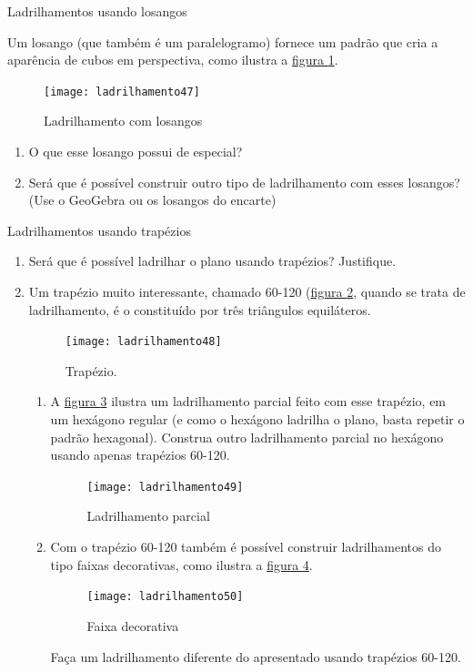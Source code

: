 \begin{task}{Ladrilhamentos usando losangos}

Um losango (que também é um paralelogramo) fornece um padrão que cria a aparência de cubos em perspectiva, como ilustra a \hyperref[losango]{figura \ref{losango}}.

	\begin{figure}[H]
	\centering
	\texttt{[image: ladrilhamento47]}
    \caption{Ladrilhamento com losangos}
   	\label{losango}
	\end{figure}
	
\begin{enumerate}
			\item O que esse losango possui de especial?
			\item Será que é possível construir outro tipo de ladrilhamento com esses losangos? (Use o GeoGebra ou os losangos do encarte)
\end{enumerate}
\end{task}

\begin{task}{Ladrilhamentos usando trapézios}
\begin{enumerate}
\item Será que é possível ladrilhar o plano usando trapézios? Justifique.

\item Um trapézio muito interessante, chamado 60-120 (\hyperref[trap1]{figura \ref{trap1}}, quando se trata de ladrilhamento, é o constituído por três triângulos equiláteros.

\begin{figure}[H]
\centering
\texttt{[image: ladrilhamento48]}
\caption{Trapézio.}
\label{trap1}
\end{figure}

\begin{enumerate}
	\item A \hyperref[trap2]{figura \ref{trap2}} ilustra um ladrilhamento parcial feito com esse trapézio, em um hexágono regular (e como o hexágono ladrilha o plano, basta repetir o padrão hexagonal). Construa outro ladrilhamento parcial no hexágono usando apenas trapézios 60-120.

	\begin{figure}[H]
	\centering
	\texttt{[image: ladrilhamento49]}
	\caption{Ladrilhamento parcial}
	\label{trap2}
	\end{figure}

	\item Com o trapézio 60-120 também é possível construir ladrilhamentos do tipo faixas decorativas, como ilustra a \hyperref[trap3]{figura \ref{trap3}}. 

	\begin{figure}[H]
	\centering
	\texttt{[image: ladrilhamento50]}
	\caption{Faixa decorativa}
     \label{trap3}
	\end{figure}
	
Faça um ladrilhamento diferente do apresentado usando trapézios 60-120.

\end{enumerate}
\end{enumerate}
\end{task}

